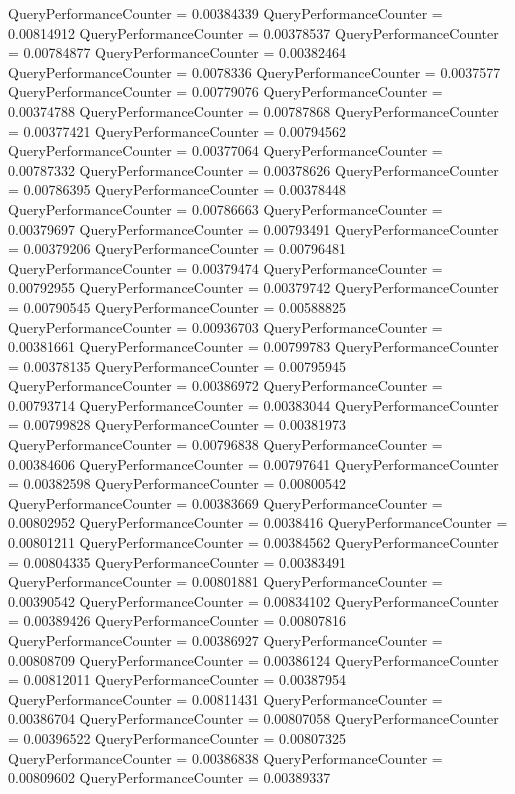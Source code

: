 \documentclass[9pt]{article}
\theoremstyle{plain}
\theoremstyle{definition}
\theoremstyle{remark}
\numberwithin{equation}{section}
\begin{document}
QueryPerformanceCounter  =  0.00384339
QueryPerformanceCounter  =  0.00814912
QueryPerformanceCounter  =  0.00378537
QueryPerformanceCounter  =  0.00784877
QueryPerformanceCounter  =  0.00382464
QueryPerformanceCounter  =  0.0078336
QueryPerformanceCounter  =  0.0037577
QueryPerformanceCounter  =  0.00779076
QueryPerformanceCounter  =  0.00374788
QueryPerformanceCounter  =  0.00787868
QueryPerformanceCounter  =  0.00377421
QueryPerformanceCounter  =  0.00794562
QueryPerformanceCounter  =  0.00377064
QueryPerformanceCounter  =  0.00787332
QueryPerformanceCounter  =  0.00378626
QueryPerformanceCounter  =  0.00786395
QueryPerformanceCounter  =  0.00378448
QueryPerformanceCounter  =  0.00786663
QueryPerformanceCounter  =  0.00379697
QueryPerformanceCounter  =  0.00793491
QueryPerformanceCounter  =  0.00379206
QueryPerformanceCounter  =  0.00796481
QueryPerformanceCounter  =  0.00379474
QueryPerformanceCounter  =  0.00792955
QueryPerformanceCounter  =  0.00379742
QueryPerformanceCounter  =  0.00790545
QueryPerformanceCounter  =  0.00588825
QueryPerformanceCounter  =  0.00936703
QueryPerformanceCounter  =  0.00381661
QueryPerformanceCounter  =  0.00799783
QueryPerformanceCounter  =  0.00378135
QueryPerformanceCounter  =  0.00795945
QueryPerformanceCounter  =  0.00386972
QueryPerformanceCounter  =  0.00793714
QueryPerformanceCounter  =  0.00383044
QueryPerformanceCounter  =  0.00799828
QueryPerformanceCounter  =  0.00381973
QueryPerformanceCounter  =  0.00796838
QueryPerformanceCounter  =  0.00384606
QueryPerformanceCounter  =  0.00797641
QueryPerformanceCounter  =  0.00382598
QueryPerformanceCounter  =  0.00800542
QueryPerformanceCounter  =  0.00383669
QueryPerformanceCounter  =  0.00802952
QueryPerformanceCounter  =  0.0038416
QueryPerformanceCounter  =  0.00801211
QueryPerformanceCounter  =  0.00384562
QueryPerformanceCounter  =  0.00804335
QueryPerformanceCounter  =  0.00383491
QueryPerformanceCounter  =  0.00801881
QueryPerformanceCounter  =  0.00390542
QueryPerformanceCounter  =  0.00834102
QueryPerformanceCounter  =  0.00389426
QueryPerformanceCounter  =  0.00807816
QueryPerformanceCounter  =  0.00386927
QueryPerformanceCounter  =  0.00808709
QueryPerformanceCounter  =  0.00386124
QueryPerformanceCounter  =  0.00812011
QueryPerformanceCounter  =  0.00387954
QueryPerformanceCounter  =  0.00811431
QueryPerformanceCounter  =  0.00386704
QueryPerformanceCounter  =  0.00807058
QueryPerformanceCounter  =  0.00396522
QueryPerformanceCounter  =  0.00807325
QueryPerformanceCounter  =  0.00386838
QueryPerformanceCounter  =  0.00809602
QueryPerformanceCounter  =  0.00389337
\end{document}
